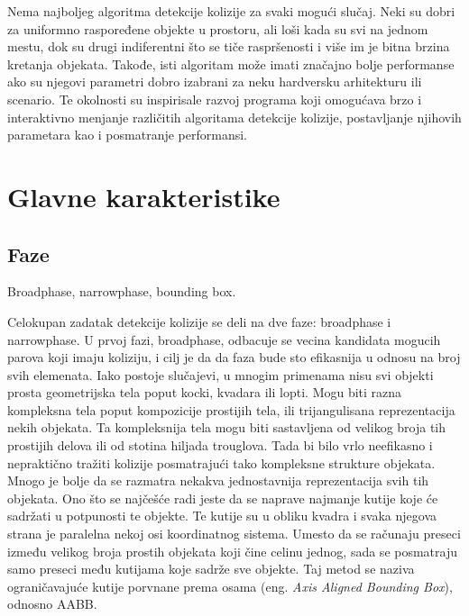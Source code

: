 \documentclass[12pt,oneside]{memoir}
\begin{document}
Nema najboljeg algoritma detekcije kolizije za svaki mogući slučaj. 
Neki su dobri za uniformno raspoređene objekte u prostoru, ali loši kada su svi na jednom mestu, 
dok su drugi indiferentni što se tiče raspršenosti i više im je bitna brzina kretanja objekata.
Takođe, isti algoritam može imati značajno bolje performanse ako su njegovi parametri dobro 
izabrani za neku hardversku arhitekturu ili scenario. 
Te okolnosti su inspirisale razvoj programa koji omogućava brzo i interaktivno menjanje različitih
algoritama detekcije kolizije, postavljanje njihovih parametara kao i posmatranje performansi.

\chapter{Glavne karakteristike}
\label{sec:karakteristike}

\section{Faze}
Broadphase, narrowphase, bounding box.

Celokupan zadatak detekcije kolizije se deli na dve faze: broadphase i narrowphase. 
U prvoj fazi, broadphase, odbacuje se vecina kandidata mogucih parova koji imaju koliziju, i cilj je da 
da faza bude sto efikasnija u odnosu na broj svih elemenata.
Iako postoje slučajevi, u mnogim primenama nisu svi objekti prosta geometrijska tela poput kocki, kvadara ili lopti.
Mogu biti razna kompleksna tela poput kompozicije prostijih tela, ili trijangulisana reprezentacija 
nekih objekata. Ta kompleksnija tela mogu biti sastavljena od velikog broja tih prostijih delova ili
od stotina hiljada trouglova. Tada bi bilo vrlo neefikasno i nepraktično tražiti kolizije posmatrajući
tako kompleksne strukture objekata. Mnogo je bolje da se razmatra nekakva jednostavnija reprezentacija svih 
tih objekata. Ono što se najčešće radi jeste da se naprave najmanje kutije koje će sadržati u potpunosti te objekte.
Te kutije su u obliku kvadra i svaka njegova strana je paralelna nekoj osi koordinatnog sistema. 
Umesto da se računaju preseci između velikog broja prostih objekata koji čine celinu jednog, sada se posmatraju 
samo preseci među kutijama koje sadrže sve objekte. Taj metod se naziva ograničavajuće kutije
porvnane prema osama (eng. {\em Axis Aligned Bounding Box}), odnosno AABB.
\end{document}
